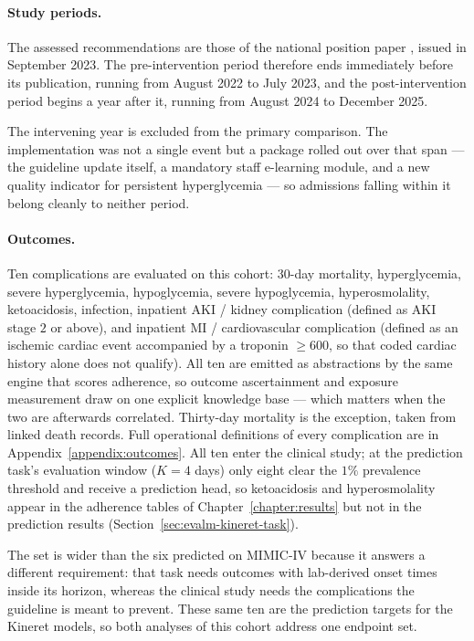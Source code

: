 \paragraph{Study periods.}
The assessed recommendations are those of the national position paper \citep{hochberg2023inpatient}, issued in September 2023. The pre-intervention period therefore ends immediately before its publication, running from August 2022 to July 2023, and the post-intervention period begins a year after it, running from August 2024 to December 2025.

The intervening year is excluded from the primary comparison. The implementation was not a single event but a package rolled out over that span --- the guideline update itself, a mandatory staff e-learning module, and a new quality indicator for persistent hyperglycemia --- so admissions falling within it belong cleanly to neither period.

\paragraph{Outcomes.}
Ten complications are evaluated on this cohort: $30$-day mortality, hyperglycemia, severe hyperglycemia, hypoglycemia, severe hypoglycemia, hyperosmolality, ketoacidosis, infection, inpatient AKI / kidney complication (defined as AKI stage $2$ or above), and inpatient MI / cardiovascular complication (defined as an ischemic cardiac event accompanied by a troponin $\ge 600$, so that coded cardiac history alone does not qualify). All ten are emitted as abstractions by the same engine that scores adherence, so outcome ascertainment and exposure measurement draw on one explicit knowledge base --- which matters when the two are afterwards correlated. Thirty-day mortality is the exception, taken from linked death records. Full operational definitions of every complication are in Appendix~\ref{appendix:outcomes}. All ten enter the clinical study; at the prediction task's evaluation window ($K = 4$ days) only eight clear the $1\%$ prevalence threshold and receive a prediction head, so ketoacidosis and hyperosmolality appear in the adherence tables of Chapter~\ref{chapter:results} but not in the prediction results (Section~\ref{sec:evalm-kineret-task}).

The set is wider than the six predicted on MIMIC-IV because it answers a different requirement: that task needs outcomes with lab-derived onset times inside its horizon, whereas the clinical study needs the complications the guideline is meant to prevent. These same ten are the prediction targets for the Kineret models, so both analyses of this cohort address one endpoint set.

